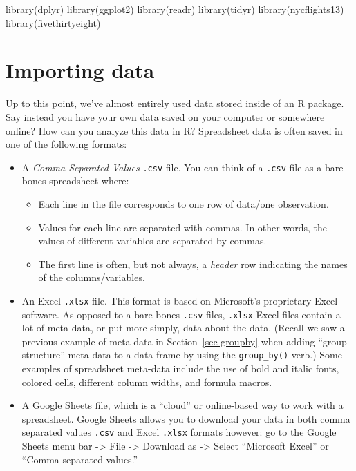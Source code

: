 \documentclass[
  letterpaper,
  DIV=11,
  numbers=noendperiod]{scrreprt}
\newenvironment{Shaded}{\begin{snugshade}}{\end{snugshade}}
\newcommand{\FunctionTok}[1]{\textcolor[rgb]{0.28,0.35,0.67}{#1}}
\newcommand{\NormalTok}[1]{\textcolor[rgb]{0.00,0.23,0.31}{#1}}
\providecommand{\tightlist}{%
  \setlength{\itemsep}{0pt}\setlength{\parskip}{0pt}}\usepackage{longtable,booktabs,array}
\theoremstyle{definition}
\theoremstyle{remark}
\begin{document}
\begin{Shaded}
\begin{Highlighting}[]
\FunctionTok{library}\NormalTok{(dplyr)}
\FunctionTok{library}\NormalTok{(ggplot2)}
\FunctionTok{library}\NormalTok{(readr)}
\FunctionTok{library}\NormalTok{(tidyr)}
\FunctionTok{library}\NormalTok{(nycflights13)}
\FunctionTok{library}\NormalTok{(fivethirtyeight)}
\end{Highlighting}
\end{Shaded}

\hypertarget{sec-csv}{%
\section{Importing data}\label{sec-csv}}

Up to this point, we've almost entirely used data stored inside of an R
package. Say instead you have your own data saved on your computer or
somewhere online? How can you analyze this data in R? Spreadsheet data
is often saved in one of the following formats:

\begin{itemize}
\item
  A \emph{Comma Separated Values} \texttt{.csv} file. You can think of a
  \texttt{.csv} file as a bare-bones spreadsheet where:

  \begin{itemize}
  \tightlist
  \item
    Each line in the file corresponds to one row of data/one
    observation.
  \item
    Values for each line are separated with commas. In other words, the
    values of different variables are separated by commas.
  \item
    The first line is often, but not always, a \emph{header} row
    indicating the names of the columns/variables.
  \end{itemize}
\item
  An Excel \texttt{.xlsx} file. This format is based on Microsoft's
  proprietary Excel software. As opposed to a bare-bones \texttt{.csv}
  files, \texttt{.xlsx} Excel files contain a lot of meta-data, or put
  more simply, data about the data. (Recall we saw a previous example of
  meta-data in Section~\ref{sec-groupby} when adding ``group structure''
  meta-data to a data frame by using the \texttt{group\_by()} verb.)
  Some examples of spreadsheet meta-data include the use of bold and
  italic fonts, colored cells, different column widths, and formula
  macros.
\item
  A \href{https://www.google.com/sheets/about/}{Google Sheets} file,
  which is a ``cloud'' or online-based way to work with a spreadsheet.
  Google Sheets allows you to download your data in both comma separated
  values \texttt{.csv} and Excel \texttt{.xlsx} formats however: go to
  the Google Sheets menu bar -\textgreater{} File -\textgreater{}
  Download as -\textgreater{} Select ``Microsoft Excel'' or
  ``Comma-separated values.''
\end{itemize}
\end{document}
